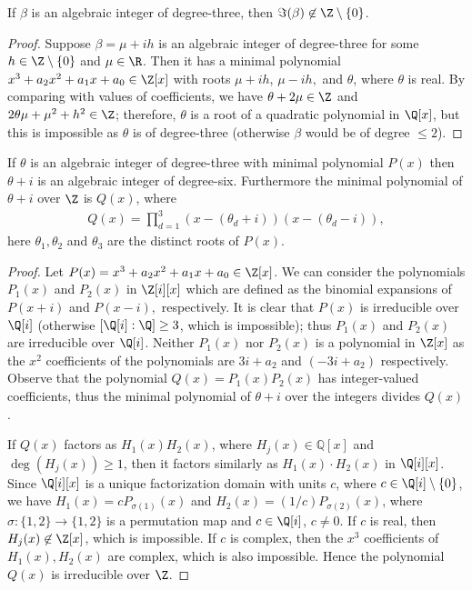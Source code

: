 \documentclass[12pt]{amsart}
\newcommand{\1}{\mathmybb{1}}
\begin{document}
\begin{lem}
\label{betaimnotinZ*}
If $\beta$ is an algebraic integer of degree-three, then $\Im(\beta) \not \in \Z\setminus\{0\}$.
\end{lem}
\begin{proof}
Suppose $\beta = \mu + ih$ is an algebraic integer of degree-three for some $h \in \Z \setminus\{0\}$ and $\mu \in \R$. Then it has a minimal polynomial $x^3+a_{2}x^2+a_{1}x+a_{0}\in \Z[x]$ with roots $\mu + ih$, $\mu -ih,$ and $\theta$, where $\theta$ is real. By comparing with values of coefficients, we have $\theta + 2\mu \in \Z$ and $2\theta\mu+\mu^2+h^2 \in \Z$; therefore, $\theta$ is a root of a quadratic polynomial in $\Q[x]$, but this is impossible as $\theta$ is of degree-three (otherwise $\beta$ would be of degree $\leq 2$).  
\end{proof}
\begin{lem}
\label{theta+ialgdeg6}
If $\theta$ is an algebraic integer of degree-three with minimal polynomial $P(x)$ then $\theta+i$ is an algebraic integer of degree-six. Furthermore the minimal polynomial of $\theta+i$ over $\Z$ is $Q(x)$, where
\begin{align*}
Q(x) = \prod_{d=1}^{3}(x-(\theta_{d}+i))(x-(\theta_{d}-i)),
\end{align*}
here $\theta_{1},\theta_{2}$ and $\theta_{3}$ are the distinct roots of $P(x)$.
\end{lem}
\begin{proof}
Let $P(x) = x^3+a_{2}x^2+a_{1}x+a_{0} \in \Z[x]$. We can consider the polynomials $P_{1}(x)$ and $P_{2}(x)$ in $\Z[i][x]$ which are defined as the binomial expansions of $P(x+i)$ and $P(x-i),$ respectively. It is clear that $P(x)$ is irreducible over $\Q[i]$ (otherwise $[\Q[i]:\Q] \geq 3$, which is impossible); thus $P_{1}(x)$ and $P_{2}(x)$ are irreducible over $\Q[i]$. Neither $P_{1}(x)$ nor $P_{2}(x)$ is a polynomial in $\Z[x]$ as the $x^2$ coefficients of the polynomials are $3i+a_{2}$ and $(-3i+a_{2})$ respectively. Observe that the polynomial $Q(x) = P_{1}(x)P_{2}(x)$ has integer-valued coefficients, thus the minimal polynomial of $\theta+i$ over the integers divides $Q(x)$.

If $Q(x)$ factors as $H_{1}(x)H_{2}(x)$, where $H_{j}(x) \in \mathbb{Q}[x]$ and $\deg(H_{j}(x)) \geq 1$, then it factors similarly as $H_{1}(x)\cdot H_{2}(x)$ in $\Q[i][x]$. Since $\Q[i][x]$ is a unique factorization domain with units $c$, where $c \in \Q[i]\setminus\{0\}$, we have $H_{1}(x) = c P_{\sigma(1)}(x)$ and $H_{2}(x) = (1/c) P_{\sigma(2)}(x) $, where $\sigma : \{1,2\}\rightarrow \{1,2\}$ is a permutation map and $c \in \Q[i]$, $c \neq 0$. If $c$ is real, then $H_{j}(x) \not\in \Z[x]$, which is impossible. If $c$ is complex, then the $x^3$ coefficients of $H_{1}(x), H_{2}(x)$ are complex, which is also impossible. Hence the polynomial $Q(x)$ is irreducible over $\Z$.
\end{proof}
\end{document}
